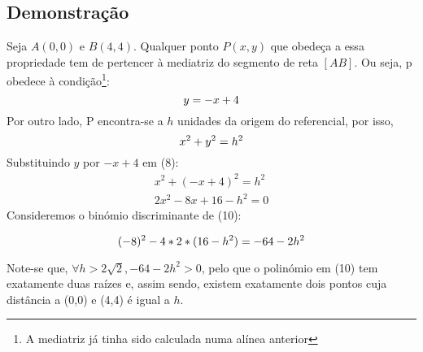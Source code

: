 \documentclass[10pt,a4paper]{article}
\begin{document}
\subsection{Demonstração}
Seja $A(0,0)$ e $B(4,4)$. Qualquer ponto $P(x,y)$ que obedeça a essa propriedade tem de pertencer à mediatriz do segmento de reta $[AB]$. Ou seja, p obedece à condição\footnote{A mediatriz já tinha sido calculada numa alínea anterior}:
\begin{equation}
y=-x+4\\
\end{equation}
Por outro lado, P encontra-se a $h$ unidades da origem do referencial, por isso,
\begin{equation}
x^2 + y^2 = h^2 \\ 
\end{equation}
Substituindo $y$ por $-x+4$ em (8):
\begin{gather}
   x^2 + (-x+4)^2 = h^2\\
   2x^2 -8x+16-h^2 = 0
\end{gather}
Consideremos o binómio discriminante de (10):

\begin{equation}
(-8)^2 -4*2*(16-h^2) = -64 - 2h^2\\
\end{equation}

Note-se que, $\forall h > 2\sqrt{2}, -64 -2h^2 > 0$, pelo que o polinómio em (10) tem exatamente duas raízes e, assim sendo, existem exatamente dois pontos cuja distância a (0,0) e (4,4) é igual a $h$.
\end{document}
